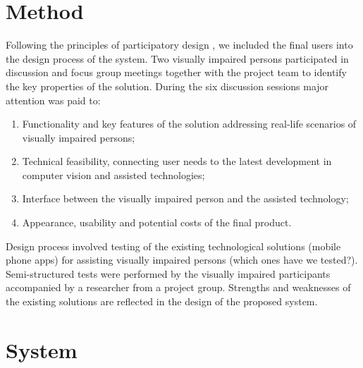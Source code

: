 \documentclass[a4paper,11pt]{article}
\begin{document}
\section{Method}
\label{sec:method}
Following the principles of participatory design \cite{Kensing}, \cite{Carroll} we included the final users into the design process of the system. Two visually impaired persons participated in discussion and focus group meetings together with the project team to identify the key properties of the solution. During the six discussion sessions major attention was paid to:
\begin{enumerate}
\item Functionality and key features of the solution addressing real-life scenarios of visually impaired persons;
\item Technical feasibility, connecting user needs to the latest development in computer vision and assisted technologies;
\item Interface between the visually impaired person and the assisted technology;
\item Appearance, usability and potential costs of the final product. 
\end{enumerate}
Design process involved testing of the existing technological solutions (mobile phone apps) for assisting visually impaired persons {\color{red}(which ones have we tested?)}. Semi-structured tests were performed by the visually impaired participants accompanied by a researcher from a project group. Strengths and weaknesses of the existing solutions are reflected in the design of the proposed system. 


\newpage
\section{System}
\label{sec:system}
\end{document}
